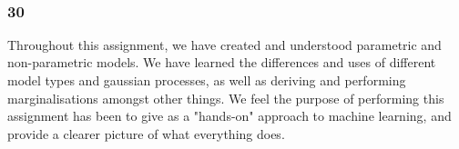 \documentclass[11pt]{article}
\begin{document}
    \begin{center}
    \end{center}
    { \hspace*{\fill} \\}

    \subsubsection{30}\label{section}

Throughout this assignment, we have created and understood parametric
and non-parametric models. We have learned the differences and uses of
different model types and gaussian processes, as well as deriving and
performing marginalisations amongst other things. We feel the purpose of
performing this assignment has been to give as a "hands-on" approach to
machine learning, and provide a clearer picture of what everything does.





    
\end{document}
